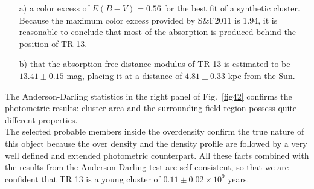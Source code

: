 \documentclass[draft]{aa}
\begin{document}
\begin{itemize}
\item [a)] a color excess of $E(B-V)=0.56$  for the best fit
of a synthetic cluster. Because the maximum color excess provided by S\&F2011
is 1.94, it is reasonable to conclude that most of the absorption is produced
behind the position of TR 13.
\item [b)] that the absorption-free distance modulus of TR 13 is estimated to be
$13.41\pm0.15$ mag, placing it at a distance of $4.81\pm0.33$ kpc from
the Sun.
\end{itemize}

The Anderson-Darling statistics in the right panel of Fig.~\ref{fig42} confirms the
photometric results: cluster area and the surrounding field region
possess quite different properties.\\

The selected probable members inside the overdensity confirm the
true nature of this object because the over density and the density profile are
followed by a very well defined and extended photometric counterpart. All these
facts combined with the results from the Anderson-Darling test are
self-consistent, so that we are confident that TR 13 is a young cluster of
$0.11\pm0.02\times10^9$ years.
\end{document}
